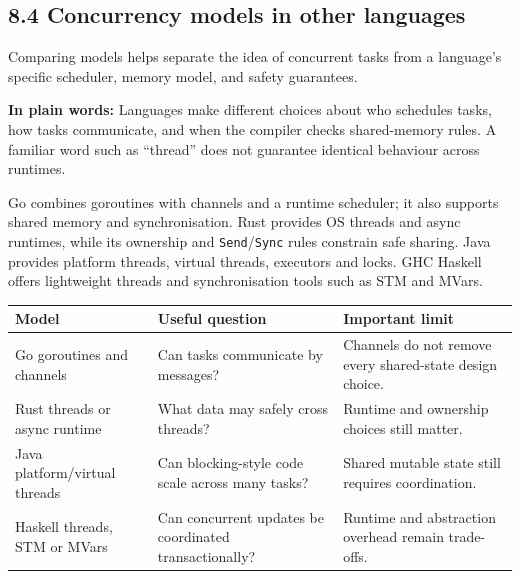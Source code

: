 \documentclass[11pt]{article}
\begin{document}
\begin{keepsection}
\section{8.4 Concurrency models in other languages}

Comparing models helps separate the idea of concurrent tasks from a language’s specific scheduler, memory model, and safety guarantees.

\begin{plainbox}\textbf{In plain words:} Languages make different choices about who schedules tasks, how tasks communicate, and when the compiler checks shared-memory rules. A familiar word such as “thread” does not guarantee identical behaviour across runtimes.\end{plainbox}

Go combines goroutines with channels and a runtime scheduler; it also supports shared memory and synchronisation. Rust provides OS threads and async runtimes, while its ownership and \texttt{Send}/\texttt{Sync} rules constrain safe sharing. Java provides platform threads, virtual threads, executors and locks. GHC Haskell offers lightweight threads and synchronisation tools such as STM and MVars.

\begin{center}\small\begin{tabularx}{\linewidth}{>{\raggedright\arraybackslash}X>{\raggedright\arraybackslash}X>{\raggedright\arraybackslash}X}\toprule
\textbf{Model} & \textbf{Useful question} & \textbf{Important limit} \\ \midrule
Go goroutines and channels & Can tasks communicate by messages? & Channels do not remove every shared-state design choice. \\
Rust threads or async runtime & What data may safely cross threads? & Runtime and ownership choices still matter. \\
Java platform/virtual threads & Can blocking-style code scale across many tasks? & Shared mutable state still requires coordination. \\
Haskell threads, STM or MVars & Can concurrent updates be coordinated transactionally? & Runtime and abstraction overhead remain trade-offs. \\
\bottomrule\end{tabularx}\end{center}


\end{keepsection}
\end{document}
